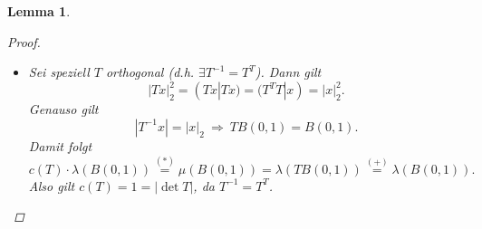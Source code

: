 \documentclass[a4paper]{scrreprt}
\theoremstyle{plain}
\newtheorem{lem}[thm]{Lemma}
\theoremstyle{definition}
\begin{document}
{{{{\begin{lem}
\begin{proof}
\begin{itemize}
            \item[2)] 
                Sei speziell $T$ orthogonal (d.h. $\exists T^{-1} = T^T$). Dann gilt
                \begin{displaymath}
                    |Tx|_2^2 = (Tx|Tx) = (T^TT|x) = |x|_2^2.
                \end{displaymath}
                Genauso gilt
                \begin{displaymath}
                    \tag{$+$}
                    |T^{-1}x| = |x|_2 \ \Rightarrow \ TB(0,1) = B(0,1).
                \end{displaymath}
                Damit folgt
                \[
                    c(T)\cdot \lambda(B(0,1)) \overset{(*)}{=} \mu(B(0,1)) = \lambda(TB(0,1)) \overset{(+)}{=} \lambda(B(0,1)).
                \]
                Also gilt $c(T) = 1 = |\det T|$, da $T^{-1} = T^T$.
            

\end{itemize}
\end{proof}
\end{lem}}}}}
\end{document}
